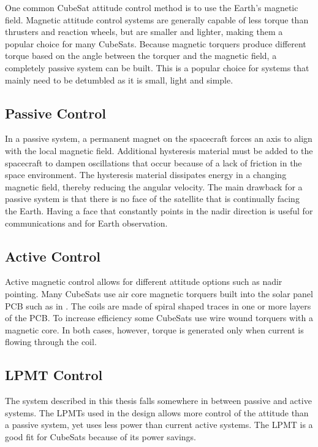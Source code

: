 One common CubeSat attitude control method is to use the Earth's magnetic field. Magnetic attitude control systems are generally capable of less torque than thrusters and reaction wheels, but are smaller and lighter, making them a popular choice for many CubeSats. Because magnetic torquers produce different torque based on the angle between the torquer and the magnetic field, a completely passive system can be built. This is a popular choice for systems that mainly need to be detumbled as it is small, light and simple. 

\subsection{Passive Control}

In a passive system, a permanent magnet on the spacecraft forces an axis to align with the local magnetic field. Additional hysteresis material must be added to the spacecraft to dampen oscillations that occur because of a lack of friction in the space environment. The hysteresis material dissipates energy in a changing magnetic field, thereby reducing the angular velocity. The main drawback for a passive system is that there is no face of the satellite that is continually facing the Earth. Having a face that constantly points in the nadir direction is useful for communications and for Earth observation.

\subsection{Active Control}

Active magnetic control allows for different attitude options such as nadir pointing. Many CubeSats use air core magnetic torquers built into the solar panel \ac{PCB} such as in \cite{6511478,ClydePannel}. The coils are made of spiral shaped traces in one or more layers of the \ac{PCB}. To increase efficiency some CubeSats use wire wound torquers with a magnetic core. In both cases, however, torque is generated only when current is flowing through the coil. 

\subsection{\acl*{LPMT} Control}

The system described in this thesis falls somewhere in between passive and active systems. The \acp{LPMT} used in the design allows more control of the attitude than a passive system, yet uses less power than current active systems. The \ac{LPMT} is a good fit for CubeSats because of its power savings.

